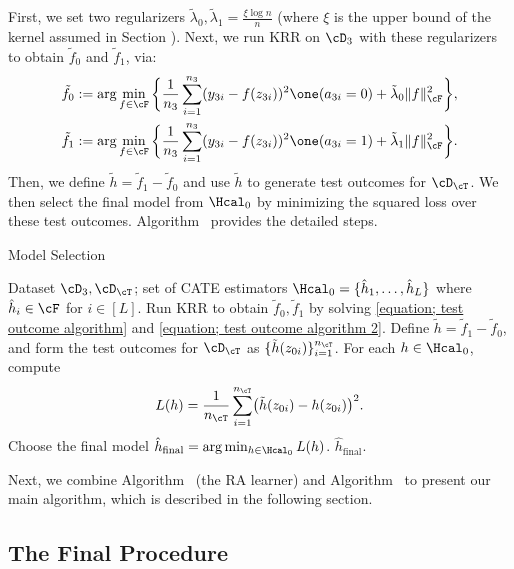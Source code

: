 \documentclass[12pt,a4paper,pdftex,onepage]{article}
\newcommand{\final}{\operatorname{final}}
\begin{document}
First, we set two regularizers \(\tilde{\lambda}_0, \tilde{\lambda}_1 = \frac{\xi \log n}{n}\) (where \(\xi\) is the upper bound of the kernel assumed in Section ).  
Next, we run KRR on \(\cD_3\) with these regularizers to obtain \(\tilde{f}_0\) and \(\tilde{f}_1\), via:
\begin{align}\label{equation; test outcome algorithm}
\tilde{f}_0 &:= \arg\min_{f \in \cF} \bigg\{\frac{1}{n_3} \sum_{i=1}^{n_3} (y_{3i} -f(z_{3i}))^2 \one(a_{3i}=0) + \tilde{\lambda}_{0} \| f\|_{\cF}^2 \bigg\}, \\
\tilde{f}_1 &:= \arg \min_{f \in \cF} \bigg\{ \frac{1}{n_3} \sum_{i=1}^{n_3} (y_{3i} -f(z_{3i}))^2\one(a_{3i}=1)  + \tilde{\lambda}_{1} \| f\|_{\cF}^2 \bigg\}. 
\label{equation; test outcome algorithm 2}
\end{align}
Then, we define $\tilde{h} = \tilde{f}_1 - \tilde{f}_0$ and use $\tilde{h}$ to generate test outcomes for \(\cD_\cT\).  
We then select the final model from \(\Hcal_0\) by minimizing the squared loss over these test outcomes.  
Algorithm~ provides the detailed steps.

\begin{algorithm}[H]
\caption{Model Selection}
\label{algorithm; model selection}
\begin{algorithmic}
\Require  Dataset \(\cD_3, \cD_\cT\); set of CATE estimators $\Hcal_0 = \{ \hat{h}_1, \dots, \hat{h}_L\}$ where \(\hat{h}_i \in \cF\) for \(i \in [L]\).
\State Run KRR to obtain $\tilde{f}_0, \tilde{f}_1$ by solving \eqref{equation; test outcome algorithm} and \eqref{equation; test outcome algorithm 2}.
\State Define $\tilde{h} = \tilde{f}_1 -\tilde{f}_0$, and form the test outcomes for \(\cD_\cT\) as \(\{\tilde{h}(z_{0i})\}_{i=1}^{n_{\cT}}\).
\State For each $h \in \Hcal_0$, compute
\[
L(h) = \frac{1}{n_\cT} \sum_{i=1}^{n_\cT} \bigl(\tilde{h}(z_{0i}) -h(z_{0i})\bigr)^2.
\]
Choose the final model $\hat{h}_{\final} = \arg \min_{h \in \Hcal_0} L(h)$.
\Ensure \(\hat{h}_{\final}\).
\end{algorithmic}
\end{algorithm}

Next, we combine Algorithm~ (the RA learner) and Algorithm~ to present our main algorithm, which is described in the following section.


\subsection{The Final Procedure}
\end{document}
